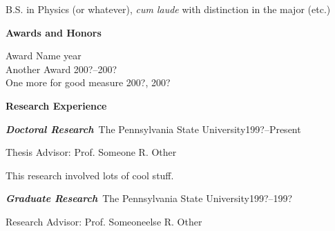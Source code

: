 \documentclass[11pt]{psuthesis}
\begin{document}
\begin{singlespace}
\smallskip

\par\noindent
\hspace{0.10truein}  
\parbox{6.15truein}{
\par\noindent
B.S. in Physics (or whatever), \textit{cum laude} with distinction in the major (etc.)
}

\medskip

\large
\centerline{{\bf Awards and Honors}}
\normalsize

\smallskip

\par\noindent
Award Name \hfill year\\
Another Award \hfill 200?--200?\\
One more for good measure \hfill 200?, 200?

\medskip

\large
\centerline{{\bf Research Experience}}
\normalsize

\smallskip

\par\noindent
\textbf{\textit{Doctoral Research}}\, The Pennsylvania State University\hfill199?--Present
\par\noindent
Thesis Advisor: Prof. Someone R. Other

\smallskip

\par\noindent
\hspace{0.10truein}  
\parbox{5.7truein}{
\par\noindent
This research involved lots of cool stuff.
}

\medskip

\par\noindent
\textbf{\textit{Graduate Research}}\, The Pennsylvania State University\hfill 199?--199?
\par\noindent
Research Advisor: Prof. Someoneelse R. Other

\smallskip


\end{singlespace}
\end{document}
